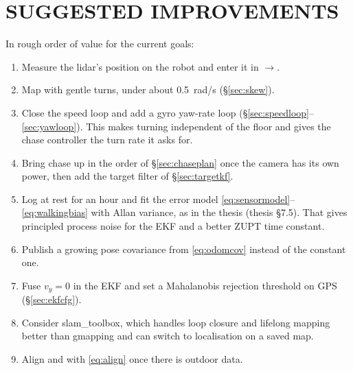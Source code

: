 \section{SUGGESTED IMPROVEMENTS}

In rough order of value for the current goals:
\begin{enumerate}
\item Measure the lidar's position on the robot and enter it in
  $\to$.
\item Map with gentle turns, under about \SI{0.5}{rad/s}
  (\S\ref{sec:skew}).
\item Close the speed loop and add a gyro yaw-rate loop
  (\S\ref{sec:speedloop}--\ref{sec:yawloop}). This makes turning independent
  of the floor and gives the chase controller the turn rate it asks for.
\item Bring chase up in the order of \S\ref{sec:chaseplan} once the camera
  has its own power, then add the target filter of \S\ref{sec:targetkf}.
\item Log  at rest for an hour and fit the
  error model \eqref{eq:sensormodel}--\eqref{eq:walkingbias} with Allan
  variance, as in the thesis (thesis \S7.5). That gives principled process
  noise for the EKF and a better ZUPT time constant.
\item Publish a growing pose covariance from \eqref{eq:odomcov} instead of the
  constant one.
\item Fuse $v_y=0$ in the EKF and set a Mahalanobis rejection threshold on
  GPS (\S\ref{sec:ekfcfg}).
\item Consider slam\_toolbox, which handles loop closure and lifelong mapping
  better than gmapping and can switch to localisation on a saved map.
\item Align  and  with \eqref{eq:align} once there is
  outdoor data.
\end{enumerate}
